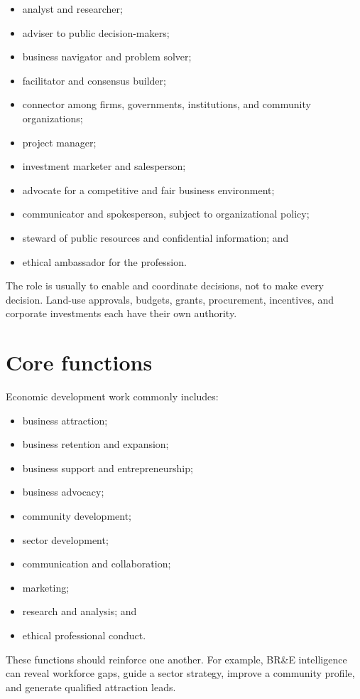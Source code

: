\documentclass[11pt,letterpaper,oneside,openany]{book}
\begin{document}
\begin{itemize}
\item analyst and researcher;
\item adviser to public decision-makers;
\item business navigator and problem solver;
\item facilitator and consensus builder;
\item connector among firms, governments, institutions, and community organizations;
\item project manager;
\item investment marketer and salesperson;
\item advocate for a competitive and fair business environment;
\item communicator and spokesperson, subject to organizational policy;
\item steward of public resources and confidential information; and
\item ethical ambassador for the profession.
\end{itemize}


The role is usually to enable and coordinate decisions, not to make every decision. Land-use approvals, budgets, grants, procurement, incentives, and corporate investments each have their own authority.


\section[Core functions]{Core functions}
Economic development work commonly includes:


\begin{itemize}
\item business attraction;
\item business retention and expansion;
\item business support and entrepreneurship;
\item business advocacy;
\item community development;
\item sector development;
\item communication and collaboration;
\item marketing;
\item research and analysis; and
\item ethical professional conduct.
\end{itemize}


These functions should reinforce one another. For example, BR\&E intelligence can reveal workforce gaps, guide a sector strategy, improve a community profile, and generate qualified attraction leads.
\end{document}
